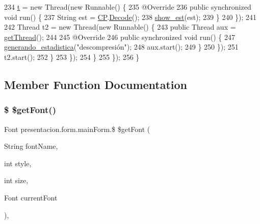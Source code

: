 \begin{DoxyCode}
234                         \hyperlink{classpresentacion_1_1form_1_1mainForm_a4643a7a227b8b65874d63d33a5adfc33}{t} = \textcolor{keyword}{new} Thread(\textcolor{keyword}{new} Runnable() \{
235                             @Override
236                             \textcolor{keyword}{public} \textcolor{keyword}{synchronized} \textcolor{keywordtype}{void} run() \{
237                                 String est = \hyperlink{classpresentacion_1_1form_1_1mainForm_a4d01396f002d4f9bd18db3877057c77b}{CP}.\hyperlink{classpresentacion_1_1Ctrl__Presentacio_1_1Ctrl__Presentacio_adc652f63ed7619207a94a3a58b6bdd77}{Decode}();
238                                 \hyperlink{classpresentacion_1_1form_1_1mainForm_a6eb9e9b4f7bb6da2c592a5a0294a6a06}{show\_est}(est);
239                             \}
240                         \});
241 
242                         Thread t2 = \textcolor{keyword}{new} Thread(\textcolor{keyword}{new} Runnable() \{
243                             \textcolor{keyword}{public} Thread aux = \hyperlink{classpresentacion_1_1form_1_1mainForm_ac6348f8bdef39bfa651f145c00664320}{getThread}();
244 
245                             @Override
246                             \textcolor{keyword}{public} \textcolor{keyword}{synchronized} \textcolor{keywordtype}{void} run() \{
247                                 \hyperlink{classpresentacion_1_1form_1_1mainForm_a34580a4b6e2c162d35ab5502f0ac7e4c}{generando\_estadistica}(\textcolor{stringliteral}{"descompresión"});
248                                 aux.start();
249                             \}
250                         \});
251                         t2.start();
252                     \}
253                 \});
254             \}
255         \});
256     \}
\end{DoxyCode}


\subsection{Member Function Documentation}
\mbox{\label{classpresentacion_1_1form_1_1mainForm_ac3c0e7ddfb95355efa609e2a7b85d34b}} 
\subsubsection{\texorpdfstring{\$ \$get\+Font()}{$ $getFont()}}
{\footnotesize\ttfamily Font presentacion.\+form.\+main\+Form.\$ \$get\+Font (\begin{DoxyParamCaption}\item[{String}]{font\+Name,  }\item[{int}]{style,  }\item[{int}]{size,  }\item[{Font}]{current\+Font }\end{DoxyParamCaption})\hspace{0.3cm}{\ttfamily [inline]}, {\ttfamily [private]}}

